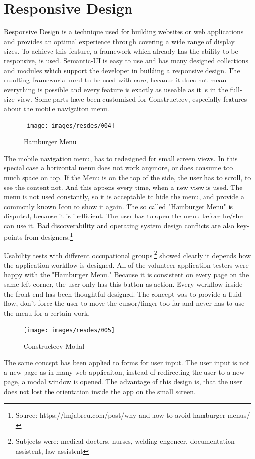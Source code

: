 \section{Responsive Design}
Responsive Design is a technique used for building websites or web applications and provides an optimal experience through covering a wide range of display sizes. To achieve this feature,  a framework which already has the ability to be responsive, is used. 
Semantic-UI is easy to use and has many designed collections and modules which support the developer in building a responsive design. The resulting frameworks need to be used with care, because it does not mean everything is possible and every feature is exactly as useable as it is in the full-size view. Some parts have been customized for Constructeev, especially features about the mobile navigaiton menu.
\begin{figure}
  \caption{Hamburger Menu}
  \centering
    \texttt{[image: images/resdes/004]}
\end{figure}
\textcolor{newcode}{The mobile navigation menu, has to redesigned for small screen views. In this special case a horizontal menu does not work anymore, or does consume too much space on top. If the Menu is on the top of the side, the user has to scroll, to see the content not. And this appens every time, when a new view is used. The menu is not used constantly, so it is acceptable to hide the menu, and provide a commonly known Icon to show it again.
The so called "Hamburger Menu" is disputed, because it is inefficient. The user has to open the menu before he/she can use it. Bad discoverability and operating system design conflicts are also key-points from designers.\footnote{Source: https://lmjabreu.com/post/why-and-how-to-avoid-hamburger-menus/}}

\textcolor{newcode}{Usability tests with different occupational groups \footnote{Subjects were: medical doctors, nurses, welding engeneer, documentation assistent, law assistent} showed clearly it depends how the application workflow is designed. All of the volunteer application testers were happy with the "Hamburger Menu." Because it is consistent on every page on the same left corner, the user only has this button as action.
Every workflow inside the front-end has been thoughtful designed. The concept was to provide a fluid flow, don't force the user to move the cursor/finger too far and never has to use the menu for a certain work.}
 \newpage
\begin{figure}
  \caption{Constructeev Modal}
  \centering
    \texttt{[image: images/resdes/005]}
\end{figure}
\textcolor{newcode}{The same concept has been applied to forms for user input. The user input is not a new page as in many web-applicaiton, instead of redirecting the user to a new page, a modal window is opened. The advantage of this design is, that the user does not lost the orientation inside the app on the small screen.}


